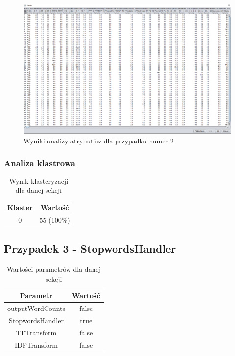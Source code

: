 \documentclass[../EDI_Task2_Karwowski_Kowalewski.tex]{subfiles}
\begin{document}
{{{            \begin{figure}[!htbp]
                \centering
                \includegraphics[width=\textwidth]{img/results1/ftims-case2.png}
                \caption{Wyniki analizy atrybutów dla przypadku numer 2}
            \end{figure}
            \FloatBarrier
        }

        \subsubsection{Analiza klastrowa} {

            \begin{table}[!htbp]
                \small
                \centering
                \begin{tabular}{|c|c|}
                    \hline
                    Klaster & Wartość \\ \hline
                    0   &  55 (100\%) \\ \hline
                \end{tabular}
                \caption{Wynik klasteryzacji dla danej sekcji}
            \end{table}
            \FloatBarrier
        }
    }

    \subsection{Przypadek 3 - StopwordsHandler} {

        \begin{table}[!htbp]
            \small
            \centering
            \begin{tabular}{|c|c|}
                \hline
                Parametr & Wartość \\ \hline
                outputWordCounts & false \\ \hline
                StopwordsHandler & true \\ \hline
                TFTransform & false \\ \hline
                IDFTransform & false \\ \hline
            \end{tabular}
            \caption{Wartości parametrów dla danej sekcji}
        \end{table}
        \FloatBarrier

}}
\end{document}
